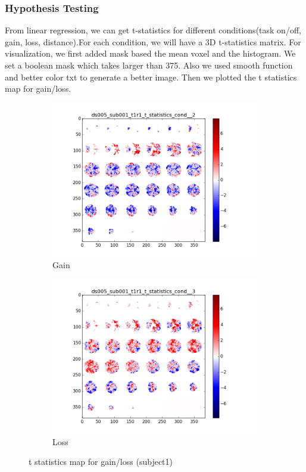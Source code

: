 \subsubsection {Hypothesis Testing}
From linear regression, we can get t-statistics for different conditions(task on/off, gain, loss, distance).For each condition, we will have a 3D t-statistics matrix. For visualization, we first added mask based the mean voxel and the histogram. We set a boolean mask which takes larger than 375. Also we used smooth function and better color txt to generate a better image. Then we plotted the t statistics map for gain/loss. 
\begin{figure}[H]
\begin{subfigure}{.5\textwidth}
  \centering
  \includegraphics[width=.8\linewidth]{../fig/t_test/ds005_sub001_t1r1_t-test_cond2.png}
  \caption{Gain}
  \label{fig:sfig1}
\end{subfigure}%
\begin{subfigure}{.5\textwidth}
  \centering
  \includegraphics[width=.8\linewidth]{../fig/t_test/ds005_sub001_t1r1_t-test_cond3.png}
  \caption{Loss}
  \label{fig:sfig2}
\end{subfigure}
\caption{t statistics map for gain/loss (subject1)}
\label{fig:fig}
\end{figure}

